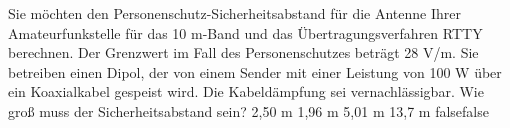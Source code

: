     {Sie möchten den Personenschutz-Sicherheitsabstand für die Antenne Ihrer Amateurfunkstelle für das 10 m-Band und das Übertragungsverfahren RTTY berechnen. Der Grenzwert im Fall des Personenschutzes beträgt 28 V/m. Sie betreiben einen Dipol, der von einem Sender mit einer Leistung von 100 W über ein Koaxialkabel gespeist wird. Die Kabeldämpfung sei vernachlässigbar. Wie groß muss der Sicherheitsabstand sein?}
    {2,50 m}
    {1,96 m}
    {5,01 m}
    {13,7 m}
    {false}{false}